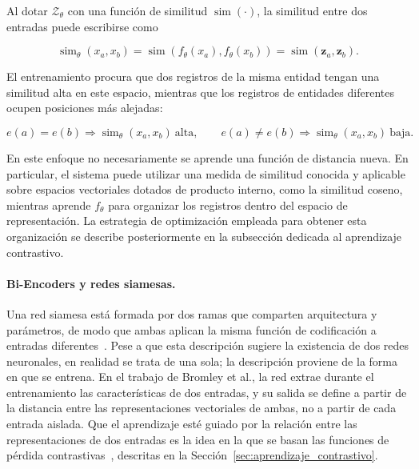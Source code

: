 Al dotar $\mathcal{Z}_\theta$ con una función de similitud $\operatorname{sim}( \cdot)$, la similitud entre dos entradas puede escribirse como

\[
\operatorname{sim}_\theta(x_a,x_b)
=\operatorname{sim}\!\left(f_\theta(x_a),f_\theta(x_b)\right)
=\operatorname{sim}(\mathbf{z}_a,\mathbf{z}_b).
\]

El entrenamiento procura que dos registros de la misma entidad tengan una similitud alta en este espacio, mientras que los registros de entidades diferentes ocupen posiciones más alejadas:

\[
e(a)=e(b)\Rightarrow
\operatorname{sim}_\theta(x_a,x_b)\ \text{alta},
\qquad
e(a)\neq e(b)\Rightarrow
\operatorname{sim}_\theta(x_a,x_b)\ \text{baja}.
\]

En este enfoque no necesariamente se aprende una función de distancia nueva. En particular, el sistema puede utilizar una medida de similitud conocida y aplicable sobre espacios vectoriales dotados de producto interno, como la similitud coseno, mientras aprende $f_\theta$ para organizar los registros dentro del espacio de representación. La estrategia de optimización empleada para obtener esta organización se describe posteriormente en la subsección dedicada al aprendizaje contrastivo.

\paragraph{Bi-Encoders y redes siamesas.}
Una red siamesa está formada por dos ramas que comparten arquitectura y parámetros, de modo que ambas aplican la misma función de codificación a entradas diferentes~\cite{bromley1993}. Pese a que esta descripción sugiere la existencia de dos redes neuronales, en realidad se trata de una sola; la descripción proviene de la forma en que se entrena. En el trabajo de Bromley et al., la red extrae durante el entrenamiento las características de dos entradas, y su salida se define a partir de la distancia entre las representaciones vectoriales de ambas, no a partir de cada entrada aislada. Que el aprendizaje esté guiado por la relación entre las representaciones de dos entradas es la idea en la que se basan las funciones de pérdida contrastivas~\cite{hadsell2006}, descritas en la Sección~\ref{sec:aprendizaje_contrastivo}.


